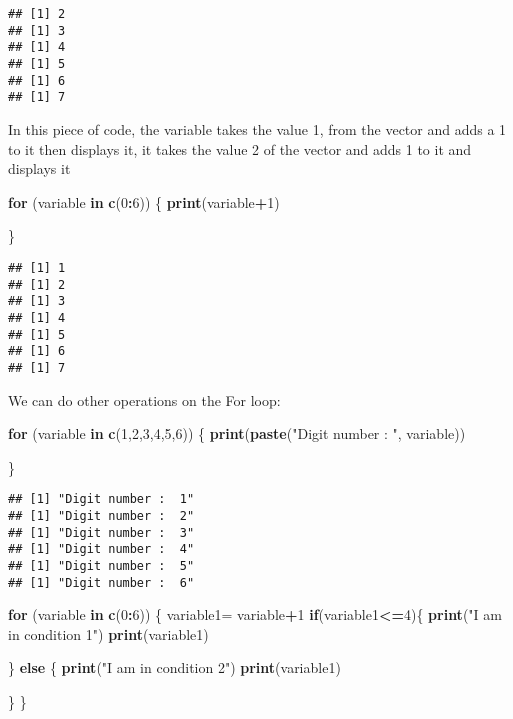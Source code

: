 \documentclass[
]{article}
\newenvironment{Shaded}{\begin{snugshade}}{\end{snugshade}}
\newcommand{\ControlFlowTok}[1]{\textcolor[rgb]{0.13,0.29,0.53}{\textbf{#1}}}
\newcommand{\DecValTok}[1]{\textcolor[rgb]{0.00,0.00,0.81}{#1}}
\newcommand{\FunctionTok}[1]{\textcolor[rgb]{0.13,0.29,0.53}{\textbf{#1}}}
\newcommand{\NormalTok}[1]{#1}
\newcommand{\OtherTok}[1]{\textcolor[rgb]{0.56,0.35,0.01}{#1}}
\newcommand{\SpecialCharTok}[1]{\textcolor[rgb]{0.81,0.36,0.00}{\textbf{#1}}}
\newcommand{\StringTok}[1]{\textcolor[rgb]{0.31,0.60,0.02}{#1}}
\begin{document}
\begin{verbatim}
## [1] 2
## [1] 3
## [1] 4
## [1] 5
## [1] 6
## [1] 7
\end{verbatim}

In this piece of code, the variable takes the value 1, from the vector
and adds a 1 to it then displays it, it takes the value 2 of the vector
and adds 1 to it and displays it

\begin{Shaded}
\begin{Highlighting}[]
\ControlFlowTok{for}\NormalTok{ (variable }\ControlFlowTok{in} \FunctionTok{c}\NormalTok{(}\DecValTok{0}\SpecialCharTok{:}\DecValTok{6}\NormalTok{)) \{}
\FunctionTok{print}\NormalTok{(variable}\SpecialCharTok{+}\DecValTok{1}\NormalTok{)  }

\NormalTok{\}}
\end{Highlighting}
\end{Shaded}

\begin{verbatim}
## [1] 1
## [1] 2
## [1] 3
## [1] 4
## [1] 5
## [1] 6
## [1] 7
\end{verbatim}

We can do other operations on the For loop:

\begin{Shaded}
\begin{Highlighting}[]
\ControlFlowTok{for}\NormalTok{ (variable }\ControlFlowTok{in} \FunctionTok{c}\NormalTok{(}\DecValTok{1}\NormalTok{,}\DecValTok{2}\NormalTok{,}\DecValTok{3}\NormalTok{,}\DecValTok{4}\NormalTok{,}\DecValTok{5}\NormalTok{,}\DecValTok{6}\NormalTok{)) \{}
\FunctionTok{print}\NormalTok{(}\FunctionTok{paste}\NormalTok{(}\StringTok{"Digit number : "}\NormalTok{, variable))  }

\NormalTok{\}}
\end{Highlighting}
\end{Shaded}

\begin{verbatim}
## [1] "Digit number :  1"
## [1] "Digit number :  2"
## [1] "Digit number :  3"
## [1] "Digit number :  4"
## [1] "Digit number :  5"
## [1] "Digit number :  6"
\end{verbatim}

\begin{Shaded}
\begin{Highlighting}[]
\ControlFlowTok{for}\NormalTok{ (variable }\ControlFlowTok{in} \FunctionTok{c}\NormalTok{(}\DecValTok{0}\SpecialCharTok{:}\DecValTok{6}\NormalTok{)) \{}
\NormalTok{variable1}\OtherTok{=}\NormalTok{ variable}\SpecialCharTok{+}\DecValTok{1} 
\ControlFlowTok{if}\NormalTok{(variable1}\SpecialCharTok{\textless{}=}\DecValTok{4}\NormalTok{)\{}
  \FunctionTok{print}\NormalTok{(}\StringTok{"I am in condition 1"}\NormalTok{)}
  \FunctionTok{print}\NormalTok{(variable1)}
  
\NormalTok{\} }\ControlFlowTok{else}\NormalTok{ \{}
  \FunctionTok{print}\NormalTok{(}\StringTok{"I am in condition 2"}\NormalTok{)}
  \FunctionTok{print}\NormalTok{(variable1)}
  
\NormalTok{\}}
\NormalTok{\}}
\end{Highlighting}
\end{Shaded}
\end{document}
